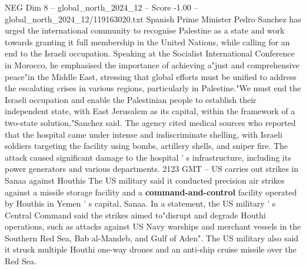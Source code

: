 \begin{textsample}{NEG Dim 8 – global\_north\_2024\_12 – Score -1.00 – global\_north\_2024\_12/119163020.txt}
Spanish Prime Minister Pedro Sanchez has urged the international community to recognise Palestine as a state and work towards granting it full membership in the United Nations, while calling for an end to the Israeli occupation.
Speaking at the Socialist International Conference in Morocco, he emphasised the importance of achieving a"just and comprehensive peace"in the Middle East, stressing that global efforts must be unified to address the escalating crises in various regions, particularly in Palestine."We must end the Israeli occupation and enable the Palestinian people to establish their independent state, with East Jerusalem as its capital, within the framework of a two-state solution,"Sanchez said.
The agency cited medical sources who reported that the hospital came under intense and indiscriminate shelling, with Israeli soldiers targeting the facility using bombs, artillery shells, and sniper fire.
The attack caused significant damage to the hospital ' s infrastructure, including its power generators and various departments. 2123 GMT -- US carries out strikes in Sanaa against Houthis The US military said it conducted precision air strikes against a missile storage facility and a \textbf{command-and-control} facility operated by Houthis in Yemen ' s capital, Sanaa.
In a statement, the US military ' s Central Command said the strikes aimed to"disrupt and degrade Houthi operations, such as attacks against US Navy warships and merchant vessels in the Southern Red Sea, Bab al-Mandeb, and Gulf of Aden".
The US military also said it struck multiple Houthi one-way drones and an anti-ship cruise missile over the Red Sea.

\end{textsample}
